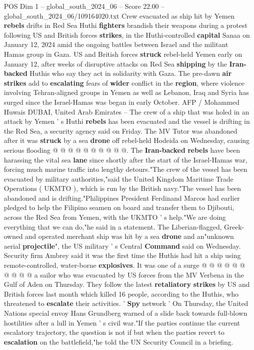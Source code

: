 \begin{textsample}{POS Dim 1 – global\_south\_2024\_06 – Score 22.00 – global\_south\_2024\_06/109164020.txt}  \label{ex:f1_pos_136}
Crew evacuated as ship hit by Yemen \textbf{rebels} drifts in Red Sea Huthi \textbf{fighters} brandish their weapons during a protest following US and British forces \textbf{strikes}, in the Huthi-controlled \textbf{capital} Sanaa on January 12, 2024 amid the ongoing battles between Israel and the militant Hamas group in Gaza.
US and British forces \textbf{struck} rebel-held Yemen early on January 12, after weeks of disruptive attacks on Red Sea \textbf{shipping} by the \textbf{Iran-backed} Huthis who say they act in solidarity with Gaza.
The pre-dawn \textbf{air} \textbf{strikes} add to \textbf{escalating} fears of \textbf{wider} conflict in the \textbf{region}, where violence involving Tehran-aligned groups in Yemen as well as Lebanon, Iraq and Syria has surged since the Israel-Hamas was began in early October.
AFP / Mohammed Huwais DUBAI, United Arab Emirates -- The crew of a ship that was holed in an attack by Yemen ' s Huthi \textbf{rebels} has been evacuated and the vessel is drifting in the Red Sea, a security agency said on Friday.
The MV Tutor was abandoned after it was \textbf{struck} by a sea \textbf{drone} off rebel-held Hodeida on Wednesday, causing serious flooding @ @ @ @ @ @ @ @ @ @.
The \textbf{Iran-backed} \textbf{rebels} have been harassing the vital sea \textbf{lane} since shortly after the start of the Israel-Hamas war, forcing much marine traffic into lengthy detours."The crew of the vessel has been evacuated by military authorities,"said the United Kingdom Maritime Trade Operations ( UKMTO ), which is run by the British navy."The vessel has been abandoned and is drifting."Philippines President Ferdinand Marcos had earlier pledged to help the Filipino seamen on board and transfer them to Djibouti, across the Red Sea from Yemen, with the UKMTO ' s help."We are doing everything that we can do,"he said in a statement.
The Liberian-flagged, Greek-owned and operated merchant ship was hit by a sea \textbf{drone} and an"unknown aerial \textbf{projectile}", the US military ' s Central \textbf{Command} said on Wednesday.
Security firm Ambrey said it was the first time the Huthis had hit a ship using remote-controlled, water-borne \textbf{explosives}.
It was one of a surge @ @ @ @ @ @ @ @ @ @ a sailor who was evacuated by US forces from the MV Verbena in the Gulf of Aden on Thursday.
They follow the latest \textbf{retaliatory} \textbf{strikes} by US and British forces last month which killed 16 people, according to the Huthis, who threatened to \textbf{escalate} their activities. ' \textbf{Spy} network ' On Thursday, the United Nations special envoy Hans Grundberg warned of a slide back towards full-blown hostilities after a lull in Yemen ' s civil war."If the parties continue the current escalatory trajectory, the question is not if but when the parties revert to \textbf{escalation} on the battlefield,"he told the UN Security Council in a briefing.

\end{textsample}
